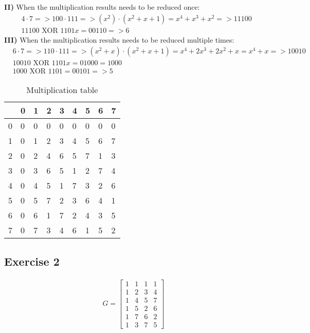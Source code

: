 \textbf{II)} When the multiplication results needs to be reduced once:
\begin{align}
    &4\cdot7 => 100 \cdot 111 => (x^2) \cdot (x^2+x+1) = x^4+x^3+x^2 => 11100 \\
    &11100 \text{ XOR } 1101x = 00110 => 6
\end{align}
\textbf{III)} When the multiplication results needs to be reduced multiple times:
\begin{align}
    &6\cdot7 => 110 \cdot 111 => (x^2+x) \cdot (x^2+x+1) = x^4 + 2x^3 + 2x^2 + x = x^4 + x => 10010 \\
    &10010 \text{ XOR } 1101x = 01000 = 1000 \\
    &1000 \text{ XOR } 1101 = 00101 => 5
\end{align}
\begin{table}[H]
    \begin{tabularx}{\textwidth}{| Y | Y | Y | Y | Y | Y | Y | Y | Y |}
        \hline
         & 0 & 1 & 2 & 3 & 4 & 5 & 6 & 7 \\\hline
        0 & 0 & 0 & 0 & 0 & 0 & 0 & 0 & 0 \\\hline
        1 & 0 & 1 & 2 & 3 & 4 & 5 & 6 & 7 \\\hline
        2 & 0 & 2 & 4 & 6 & 5 & 7 & 1 & 3 \\\hline
        3 & 0 & 3 & 6 & 5 & 1 & 2 & 7 & 4 \\\hline
        4 & 0 & 4 & 5 & 1 & 7 & 3 & 2 & 6 \\\hline
        5 & 0 & 5 & 7 & 2 & 3 & 6 & 4 & 1 \\\hline
        6 & 0 & 6 & 1 & 7 & 2 & 4 & 3 & 5 \\\hline
        7 & 0 & 7 & 3 & 4 & 6 & 1 & 5 & 2 \\\hline
    \end{tabularx}
    \caption{Multiplication table}
    \label{tab:ff21b}
\end{table}

\subsection{Exercise 2}
\begin{align}
    G = 
    \begin{bmatrix}
        1 & 1 & 1 & 1 \\
        1 & 2 & 3 & 4 \\
        1 & 4 & 5 & 7 \\
        1 & 5 & 2 & 6 \\
        1 & 7 & 6 & 2 \\
        1 & 3 & 7 & 5
    \end{bmatrix}
\end{align}

